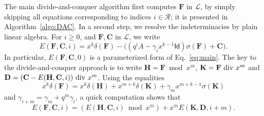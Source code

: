 \documentclass[]{sig-alternate}
\def\partial{\delta}
\def\Id{\ensuremath{\mathsf{Id}}}
\begin{document}
The main divide-and-conquer algorithm first computes $\mathbf{F}$ in
$\mathscr{L}$, by simply skipping all equations corresponding to
indices $i \in \mathcal{R}$; it is presented in
Algorithm~\ref{algo:DAC}. In a second step, we resolve the
indeterminacies by plain linear algebra.  For $i\ge 0$, and
$\mathbf{F},\mathbf{C}$ in $\mathscr{L}$, we write
$$ E(\mathbf{F},\mathbf{C},i) = x^k \partial(\mathbf{F}) - \Big( (q^i
A-\gamma_i x^{k-1} \Id) \sigma(\mathbf{F}) + \mathbf{C}\Big ).$$ In
particular, $E(\mathbf{F},\mathbf{C},0)$ is a parameterized form of
Eq.~\eqref{eq:main}.  The key to the divide-and-conquer approach is
to write $\mathbf{H}=\mathbf{F} \bmod x^m$,
$\mathbf{K}=\mathbf{F}{\rm~div~} x^m$ and ${\mathbf{D}}=(\mathbf{C}-
E(\mathbf{H},\mathbf{C},i)) {\rm~div~} x^m$.  Using the equalities
  \[x^k\partial (\mathbf{F})=x^k\partial (\mathbf{H})+x^{m+k}\partial (\mathbf{K})+\gamma_mx^{m+k-1}\sigma(\mathbf{K})\]
  and $\gamma_{i+m} = \gamma_m + q^m
  \gamma_i$, a quick computation shows that
  \begin{equation}\label{eq:E}
E(\mathbf{F},\mathbf{C},i) = \left( E(\mathbf{H},\mathbf{C},i) \bmod x^m \right )+ x^m E(\mathbf{K},{\mathbf{D}},i+m).
  \end{equation}
\end{document}
